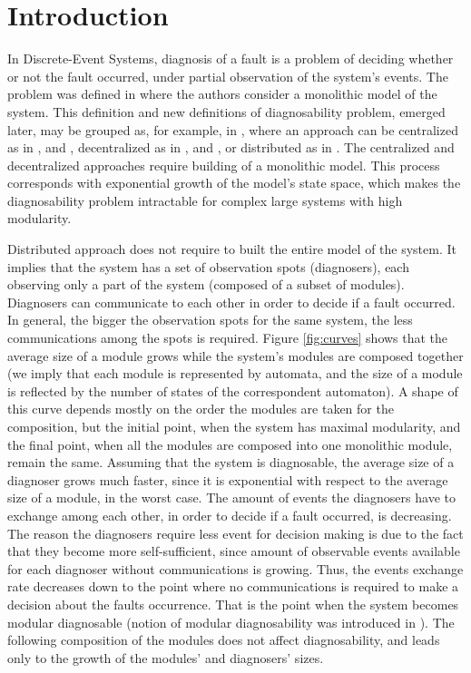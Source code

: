 \documentclass[a4paper, 10pt, conference]{ieeeconf}
\begin{document}
\section{Introduction}

In Discrete-Event Systems, diagnosis of a fault is a problem of deciding whether
or not the fault occurred, under partial observation of the system's events.
The problem was defined in \cite{sampath_diagnosability_1995} where the authors
consider a monolithic model of the system. This definition and new definitions
of diagnosability problem, emerged later, may be grouped as, for example, in
\cite{su_global_2005}, where an approach can be centralized as in
\cite{sampath_diagnosability_1995}, \cite{jiang_polynomial_2001} and
\cite{yoo_polynomial-time_2002}, 
decentralized as in \cite{debouk_coordinated_1998},
\cite{pencole_formal_2005} and \cite{qiu_decentralized_2006}, 
or distributed as in \cite{su_distributed_2002}.
The centralized and decentralized approaches require building of a monolithic
model. This process corresponds with exponential growth of the model's state
space, which makes the diagnosability problem intractable for complex large
systems with high modularity.

Distributed approach does not require to built the entire model of
the system. It implies that the system has a set of observation spots
(diagnosers), each observing only a part of the system (composed of a subset of
modules). Diagnosers can communicate to each other in order to decide if a fault
occurred. In general, the bigger the observation spots for the same
system, the less communications among the spots is required.
Figure \ref{fig:curves} shows that the average size of a module grows while the
system's modules are composed together (we imply that each module is represented
by automata, and the size of a module is reflected by the number of states of
the correspondent automaton).
A shape of this curve depends mostly on the order the modules are taken for the
composition, but the initial point, when the system has maximal modularity, and
the final point, when all the modules are composed into one monolithic module,
remain the same. Assuming that the system is diagnosable, the average size of a
diagnoser grows much faster, since it is exponential with respect to the average
size of a module, in the worst case.
The amount of events the diagnosers have to exchange among each other, in order
to decide if a fault occurred, is decreasing. The reason the diagnosers require
less event for decision making is due to the fact that they become more
self-sufficient, since amount of observable events available for each
diagnoser without communications is growing. Thus, the events exchange rate
decreases down to the point where no communications is required to make a
decision about the faults occurrence. That is the point when the system becomes
modular diagnosable (notion of modular diagnosability was introduced in
\cite{contant_diagnosability_2006}). The following composition of the modules
does not affect diagnosability, and leads only to the growth of the modules' and
diagnosers' sizes. 
\end{document}
